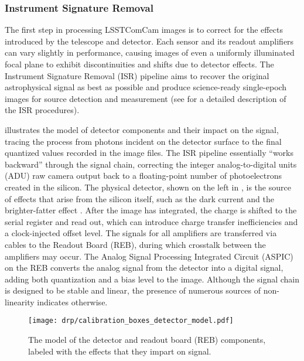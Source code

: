 \subsubsection{Instrument Signature Removal}
\label{ssec:isr}
The first step in processing LSSTComCam images is to correct for the effects introduced by the telescope and detector.
Each sensor and its readout amplifiers can vary slightly in performance, causing images of even a uniformly illuminated focal plane to exhibit discontinuities and shifts due to detector effects.
The Instrument Signature Removal (ISR) pipeline aims to recover the original astrophysical signal as best as possible and produce science-ready single-epoch images for source detection and measurement (see \citealt{SITCOMTN-086,2025JATIS..11a1209P} for a detailed description of the ISR procedures).

 illustrates the model of detector components and their impact on the signal, tracing the process from photons incident on the detector surface to the final quantized values recorded in the image files.
The ISR pipeline essentially ``works backward'' through the signal chain, correcting the integer analog-to-digital units (ADU) raw camera output back to a floating-point number of photoelectrons created in the silicon.
The physical detector, shown on the left in  , is the source of effects that arise from the silicon itself, such as the dark current and the brighter-fatter effect \citep{doi:10.1088/1538-3873/aab820,2024PASP..136d5003B}.
After the image has integrated, the charge is shifted  to the serial register and read out, which can introduce charge transfer inefficiencies and a clock-injected offset level.
The signals for all amplifiers are transferred via cables to the Readout Board (REB), during which crosstalk between the amplifiers may occur.
The Analog Signal Processing Integrated Circuit (ASPIC) on the REB converts the analog signal from the detector into a digital signal, adding both quantization and a bias level to the image.
Although the signal chain is designed to be stable and linear, the presence of numerous sources of non-linearity indicates otherwise.
\begin{figure}[htb]
  \centering
  \texttt{[image: drp/calibration\_boxes\_detector\_model.pdf]}
  \caption{The model of the detector and readout board (REB) components, labeled with the effects that they impart on signal.}
  \label{fig:isr_signal_chain}
\end{figure}

